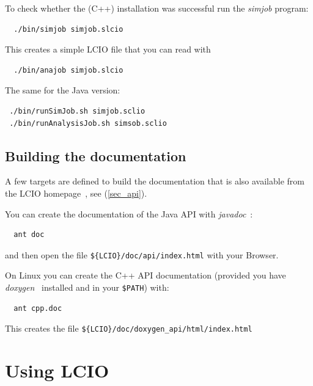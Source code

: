 \documentclass[twoside]{article}
\begin{document}
To check whether the (C++) installation was successful run the {\it simjob} program:
\begin{verbatim}
  ./bin/simjob simjob.slcio
\end{verbatim}
This creates a simple LCIO file that you can read with 
\begin{verbatim}
  ./bin/anajob simjob.slcio
\end{verbatim}
The same for the Java version:
\begin{verbatim}
 ./bin/runSimJob.sh simjob.sclio
 ./bin/runAnalysisJob.sh simsob.sclio
\end{verbatim}

\subsection {Building the documentation} \label{build_doc}

A few targets are defined to build the documentation that is also available from the 
LCIO homepage~\cite{lcio_home}, see (\ref{sec_api}).

You can create the documentation of the Java API with {\em javadoc}~\cite{ref_javadoc}:
\begin{verbatim}
  ant doc 
\end{verbatim}
and then open the file \verb|${LCIO}/doc/api/index.html| with your Browser. %

\vspace{\baselineskip}
On Linux you can create the C++ API documentation (provided you have {\em doxygen}~\cite{ref_doxygen} 
installed and in your \verb|$PATH|) %
with:
\begin{verbatim}
  ant cpp.doc      
\end{verbatim}
This creates the file \verb|${LCIO}/doc/doxygen_api/html/index.html|   %

\newpage
\section{Using LCIO}
\end{document}
